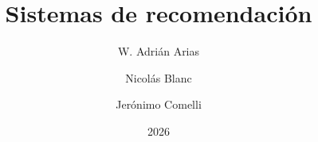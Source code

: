 \documentclass[11pt,oneside]{book}
\begin{document}
	
	
	
	\pagecolor{onyx}
	\thispagestyle{empty}
	




	\pagecolor{white}
	\thispagestyle{empty}
	\author{
		W. Adrián Arias \\
		\and
		Nicolás Blanc \\
		\and
		Jerónimo Comelli\\
	}
	\title{Sistemas de recomendación}
	\date{2026}
	\maketitle\thispagestyle{empty}
	
	\frontmatter
	\tableofcontents
	
	\mainmatter
	
	
	
	
	

	\nocite{*}
	\printbibliography
	
\end{document}
